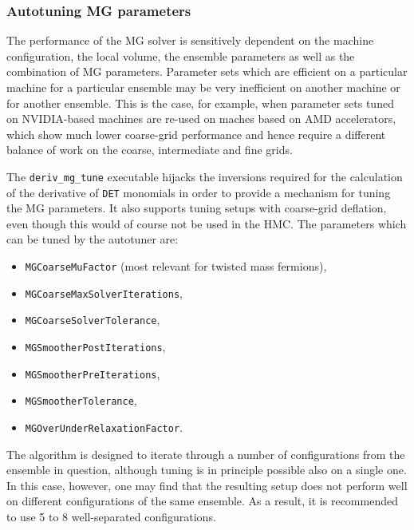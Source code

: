 \subsubsection{Autotuning MG parameters}

The performance of the MG solver is sensitively dependent on the machine configuration, the local volume, the ensemble parameters as well as the combination of MG parameters.
Parameter sets which are efficient on a particular machine for a particular ensemble may be very inefficient on another machine or for another ensemble.
This is the case, for example, when parameter sets tuned on NVIDIA-based machines are re-used on maches based on AMD accelerators, which show much lower coarse-grid performance and hence require a different balance of work on the coarse, intermediate and fine grids.

The \texttt{deriv\_mg\_tune} executable hijacks the inversions required for the calculation of the derivative of \texttt{DET} monomials in order to provide a mechanism for tuning the MG parameters.
It also supports tuning setups with coarse-grid deflation, even though this would of course not be used in the HMC.
The parameters which can be tuned by the autotuner are: 
\begin{itemize}
  \item \texttt{MGCoarseMuFactor} (most relevant for twisted mass fermions),
  \item \texttt{MGCoarseMaxSolverIterations},
  \item \texttt{MGCoarseSolverTolerance},
  \item \texttt{MGSmootherPostIterations},
  \item \texttt{MGSmootherPreIterations},
  \item \texttt{MGSmootherTolerance},
  \item \texttt{MGOverUnderRelaxationFactor}.
\end{itemize}

The algorithm is designed to iterate through a number of configurations from the ensemble in question, although tuning is in principle possible also on a single one.
In this case, however, one may find that the resulting setup does not perform well on different configurations of the same ensemble.
As a result, it is recommended to use 5 to 8 well-separated configurations.

